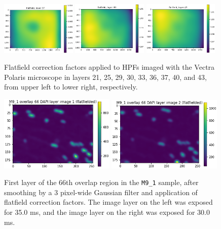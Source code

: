 \documentclass[letterpaper,11pt]{article}
\begin{document}
\begin{figure}[!ht]
\includegraphics[width=0.32\textwidth]{images/methods/flatfield_layers_polaris/flatfield_layer_37}
\includegraphics[width=0.32\textwidth]{images/methods/flatfield_layers_polaris/flatfield_layer_40}
\includegraphics[width=0.32\textwidth]{images/methods/flatfield_layers_polaris/flatfield_layer_43}
\caption{\footnotesize Flatfield correction factors applied to HPFs imaged with the Vectra Polaris microscope in layers 21, 25, 29, 30, 33, 36, 37, 40, and 43, from upper left to lower right, respectively.}
\label{fig:applied_flatfield_layers_polaris_2}
\end{figure}

\begin{figure}[!ht]
\centering
\includegraphics[width=0.49\textwidth]{images/methods/smoothed_flatfielded_M9_1_overlap_66_dapi_image_1}
\includegraphics[width=0.49\textwidth]{images/methods/smoothed_flatfielded_M9_1_overlap_66_dapi_image_2}
\caption{\footnotesize First layer of the 66th overlap region in the \texttt{M9\_1} sample, after smoothing by a 3 pixel-wide Gaussian filter and application of flatfield correction factors. The image layer on the left was exposed for 35.0 ms, and the image layer on the right was exposed for 30.0 ms.}
\label{fig:smoothed_flatfielded_M9_1_overlap_66}
\end{figure}
\end{document}
